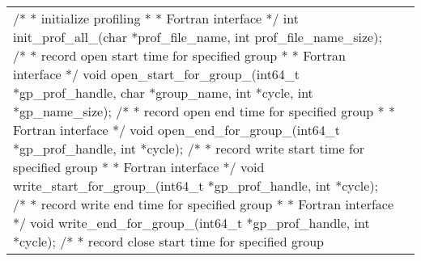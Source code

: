 \vspace{10pt}
\begin{longtable}{|p{4.448in}|p{0.052in}|}
\hline
\begin{minipage}[t]{4.448in}\raggedright /*\linebreak
* initialize profiling \linebreak
*\linebreak
* Fortran interface\linebreak
*/\linebreak
int init\_prof\_all\_(char *prof\_file\_name, int prof\_file\_name\_size);\linebreak
/*\linebreak
* record open start time for specified group\linebreak
*\linebreak
* Fortran interface\linebreak
*/\linebreak
void open\_start\_for\_group\_(int64\_t *gp\_prof\_handle, char *group\_name, int 
*cycle, int *gp\_name\_size);\linebreak
/*\linebreak
* record open end time for specified group\linebreak
*\linebreak
* Fortran interface\linebreak
*/\linebreak
void open\_end\_for\_group\_(int64\_t *gp\_prof\_handle, int *cycle);\linebreak
/*\linebreak
* record write start time for specified group\linebreak
*\linebreak
* Fortran interface\linebreak
*/\linebreak
void write\_start\_for\_group\_(int64\_t *gp\_prof\_handle, int *cycle);\linebreak
/*\linebreak
* record write end time for specified group\linebreak
*\linebreak
* Fortran interface\linebreak
*/\linebreak
void write\_end\_for\_group\_(int64\_t *gp\_prof\_handle, int *cycle);\linebreak
/*\linebreak
* record close start time for specified group\linebreak

\end{minipage}
\end{longtable}
